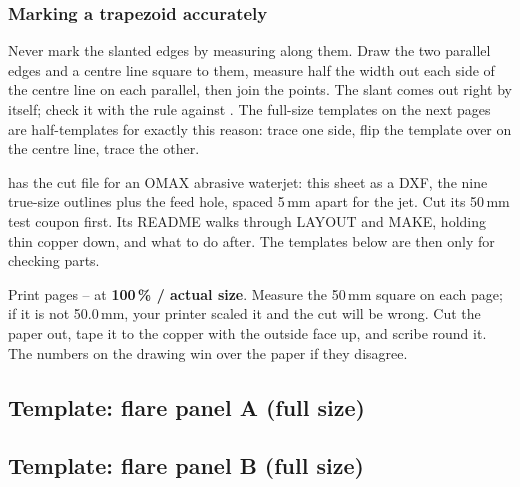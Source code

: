 \documentclass[10pt]{article}
\begin{document}
\subsubsection*{Marking a trapezoid accurately}
Never mark the slanted edges by measuring along them. Draw the two parallel edges and a centre line square to them, measure half the width out each side of the centre line on each parallel, then join the points. The slant comes out right by itself; check it with the rule against \seam. The full-size templates on the next pages are half-templates for exactly this reason: trace one side, flip the template over on the centre line, trace the other.

\begin{note}
 has the cut file for an OMAX abrasive waterjet: this sheet as a DXF, the nine true-size outlines plus the feed hole, spaced 5\,mm apart for the jet. Cut its 50\,mm test coupon first. Its README walks through LAYOUT and MAKE, holding thin copper down, and what to do after. The templates below are then only for checking parts.
\end{note}
\begin{note}
Print pages \pageref{tmpl:A}–\pageref{tmpl:pipe} at \textbf{100\,\% / actual size}. Measure the 50\,mm square on each page; if it is not 50.0\,mm, your printer scaled it and the cut will be wrong. Cut the paper out, tape it to the copper with the outside face up, and scribe round it. The numbers on the drawing win over the paper if they disagree.
\end{note}

\newpage
\subsection{Template: flare panel A (full size)}\label{tmpl:A}
\begin{center}

\end{center}
\vfill
\begin{center}\checksquare\end{center}

\newpage
\subsection{Template: flare panel B (full size)}\label{tmpl:B}
\begin{center}

\end{center}
\vfill
\begin{center}\checksquare\end{center}
\end{document}
